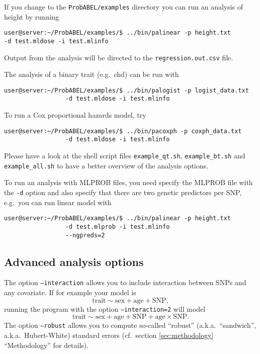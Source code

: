 \documentclass[12pt,a4paper]{article}
\begin{document}
If you change to the \texttt{ProbABEL/examples} directory you can run
an analysis of height by running
\begin{verbatim}
user@server:~/ProbABEL/examples/$ ../bin/palinear -p height.txt
-d test.mldose -i test.mlinfo
\end{verbatim}
Output from the analysis will be directed to the
\texttt{regression.out.csv} file.

The analysis of a binary trait (e.g.~chd) can be run with
\begin{verbatim}
user@server:~/ProbABEL/examples/$ ../bin/palogist -p logist_data.txt
				 -d test.mldose -i test.mlinfo
\end{verbatim}

To run a Cox proportional hazards model, try
\begin{verbatim}
user@server:~/ProbABEL/examples/$ ../bin/pacoxph -p coxph_data.txt
				 -d test.mldose -i test.mlinfo
\end{verbatim}

Please have a look at the shell script files \texttt{example\_qt.sh},
\texttt{example\_bt.sh} and \texttt{example\_all.sh} to have
a better overview of the analysis options.

To run an analysis with MLPROB files, you need specify the MLPROB file
with the \texttt{-d} option and also specify that there are two
genetic predictors per SNP, e.g.~you can run linear model with
\begin{verbatim}
user@server:~/ProbABEL/examples/$ ../bin/palinear -p height.txt
				 -d test.mlprob -i test.mlinfo
				 --ngpreds=2
\end{verbatim}

\subsection{Advanced analysis options}
The option \texttt{--interaction} allows you to include interaction
between SNPs and any covariate. If for example your model is
\begin{equation*}
  \textrm{trait} \sim \textrm{sex} + \textrm{age} + \textrm{SNP},
\end{equation*}
running the program with the option \texttt{--interaction=2} will model
\begin{equation*}
  \textrm{trait} \sim \textrm{sex} + \textrm{age} + \textrm{SNP} +
  \textrm{age} \times \mathrm{SNP}.
\end{equation*}
The option \texttt{--robust} allows you to compute so-called
``robust'' (a.k.a.~``sandwich'', a.k.a.~Hubert-White) standard errors
(cf.~section \ref{sec:methodology} ``Methodology'' for details).
\end{document}
